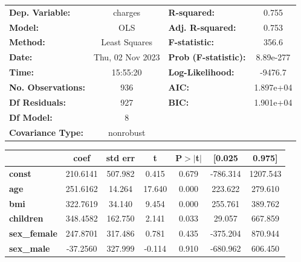 \begin{center}
\begin{tabular}{lclc}
\toprule
\textbf{Dep. Variable:}    &     charges      & \textbf{  R-squared:         } &     0.755   \\
\textbf{Model:}            &       OLS        & \textbf{  Adj. R-squared:    } &     0.753   \\
\textbf{Method:}           &  Least Squares   & \textbf{  F-statistic:       } &     356.6   \\
\textbf{Date:}             & Thu, 02 Nov 2023 & \textbf{  Prob (F-statistic):} & 8.89e-277   \\
\textbf{Time:}             &     15:55:20     & \textbf{  Log-Likelihood:    } &   -9476.7   \\
\textbf{No. Observations:} &         936      & \textbf{  AIC:               } & 1.897e+04   \\
\textbf{Df Residuals:}     &         927      & \textbf{  BIC:               } & 1.901e+04   \\
\textbf{Df Model:}         &           8      & \textbf{                     } &             \\
\textbf{Covariance Type:}  &    nonrobust     & \textbf{                     } &             \\
\bottomrule
\end{tabular}
\begin{tabular}{lcccccc}
                           & \textbf{coef} & \textbf{std err} & \textbf{t} & \textbf{P$> |$t$|$} & \textbf{[0.025} & \textbf{0.975]}  \\
\midrule
\textbf{const}             &     210.6141  &      507.982     &     0.415  &         0.679        &     -786.314    &     1207.543     \\
\textbf{age}               &     251.6162  &       14.264     &    17.640  &         0.000        &      223.622    &      279.610     \\
\textbf{bmi}               &     322.7619  &       34.140     &     9.454  &         0.000        &      255.761    &      389.762     \\
\textbf{children}          &     348.4582  &      162.750     &     2.141  &         0.033        &       29.057    &      667.859     \\
\textbf{sex\_female}       &     247.8701  &      317.486     &     0.781  &         0.435        &     -375.204    &      870.944     \\
\textbf{sex\_male}         &     -37.2560  &      327.999     &    -0.114  &         0.910        &     -680.962    &      606.450     \\

\end{tabular}
\end{center}
